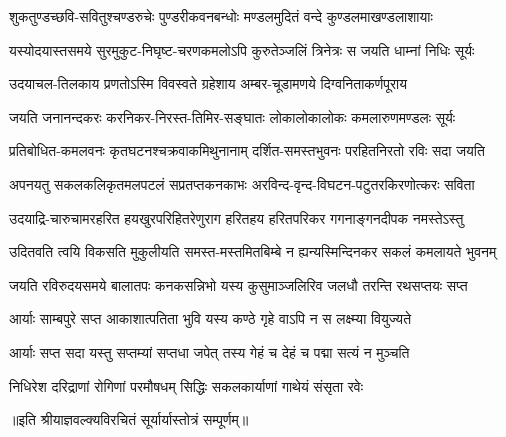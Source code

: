 

\twolineshloka
{शुकतुण्डच्छवि-सवितुश्चण्डरुचेः पुण्डरीकवनबन्धोः}
{मण्डलमुदितं वन्दे कुण्डलमाखण्डलाशायाः}%

\twolineshloka
{यस्योदयास्तसमये सुरमुकुट-निघृष्ट-चरणकमलोऽपि}
{कुरुतेञ्जलिं त्रिनेत्रः स जयति धाम्नां निधिः सूर्यः}%

\twolineshloka
{उदयाचल-तिलकाय प्रणतोऽस्मि विवस्वते ग्रहेशाय}
{अम्बर-चूडामणये दिग्वनिताकर्णपूराय}%

\twolineshloka
{जयति जनानन्दकरः करनिकर-निरस्त-तिमिर-सङ्घातः}
{लोकालोकालोकः कमलारुणमण्डलः सूर्यः}%

\twolineshloka
{प्रतिबोधित-कमलवनः कृतघटनश्चक्रवाकमिथुनानाम्}
{दर्शित-समस्तभुवनः परहितनिरतो रविः सदा जयति}%

\twolineshloka
{अपनयतु सकलकलिकृतमलपटलं सप्रतप्तकनकाभः}
{अरविन्द-वृन्द-विघटन-पटुतरकिरणोत्करः सविता}%

\twolineshloka
{उदयाद्रि-चारुचामरहरित हयखुरपरिहितरेणुराग}
{हरितहय हरितपरिकर गगनाङ्गनदीपक नमस्तेऽस्तु}%

\twolineshloka
{उदितवति त्वयि विकसति मुकुलीयति समस्त-मस्तमितबिम्बे}
{न ह्यन्यस्मिन्दिनकर सकलं कमलायते भुवनम्}%

\twolineshloka
{जयति रविरुदयसमये बालातपः कनकसन्निभो यस्य}
{कुसुमाञ्जलिरिव जलधौ तरन्ति रथसप्तयः सप्त}%

\twolineshloka
{आर्याः साम्बपुरे सप्त आकाशात्पतिता भुवि}
{यस्य कण्ठे गृहे वाऽपि न स लक्ष्म्या वियुज्यते}%

\twolineshloka
{आर्याः सप्त सदा यस्तु सप्तम्यां सप्तधा जपेत्}
{तस्य गेहं च देहं च पद्मा सत्यं न मुञ्चति}%

\twolineshloka
{निधिरेश दरिद्राणां रोगिणां परमौषधम्}
{सिद्धिः सकलकार्याणां गाथेयं संसृता रवेः}%

॥इति श्रीयाज्ञवल्क्यविरचितं सूर्यार्यास्तोत्रं सम्पूर्णम्॥

